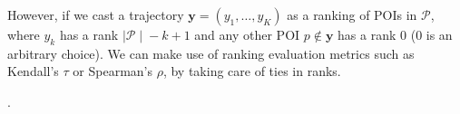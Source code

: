 However, if we cast a trajectory $\mathbf{y} = (y_1,\dots,y_K)$ as a ranking of POIs in $\mathcal{P}$,
where $y_k$ has a rank $\mid\!\! \mathcal{P} \!\!\mid\! - k + 1$ and any other POI $p \notin \mathbf{y}$ has a rank $0$ ($0$ is an arbitrary choice).
We can make use of ranking evaluation metrics such as Kendall's $\tau$ or Spearman's $\rho$, by taking care of ties in ranks.

.
